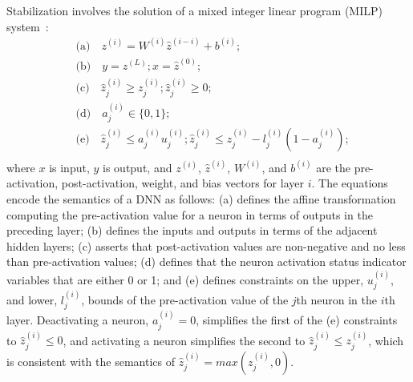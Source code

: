 \documentclass[oneside,11pt,dvipsnames]{book}
\numberwithin{equation}{section}
\theoremstyle{definition}
\theoremstyle{remark}
\newcommand{\functiontextformat}[1]{\textrm{\texttt{#1}}}
\newcommand{\tool}{\texttt{NeuralSAT}}
\begin{document}

Stabilization involves the solution of a mixed integer linear program (MILP) system~\cite{tjeng2019evaluating}:
\begin{equation}
    \begin{aligned}
        &\mbox{(a)}\quad z^{(i)} = W^{(i)} \hat{z}^{(i-i)} + b^{(i)}; \\
        &\mbox{(b)}\quad y = z^{(L)};  x = \hat{z}^{(0)}; \\
        &\mbox{(c)}\quad \hat{z}_j^{(i)} \ge {z}_j^{(i)}; \hat{z}_j^{(i)} \ge 0; \\
        &\mbox{(d)}\quad a_j^{(i)} \in \{ 0, 1\} ;\\
        &\mbox{(e)}\quad \hat{z}_j^{(i)} \le {a}_j^{(i)} {u}_j^{(i)}; \hat{z}_j^{(i)} \le {z}_j^{(i)} - {l}_j^{(i)}(1 - {a}_j^{(i)}); \\
    \end{aligned}
    \label{eq:mip}
\end{equation}
where $x$ is input, $y$ is output, and $z^{(i)}$, $\hat{z}^{(i)}$, $W^{(i)}$, and $b^{(i)}$ are the pre-activation, post-activation, weight, and bias vectors for layer $i$.
The equations encode the semantics of a DNN as follows:
(a) defines the affine transformation computing the pre-activation value for a neuron in terms of outputs in the preceding layer;
(b) defines the inputs and outputs in terms of the adjacent hidden layers;
(c) asserts that post-activation values are non-negative and no less than pre-activation values;
(d) defines that the neuron activation status indicator variables that are either 0 or 1; and
(e) defines constraints on the upper, $u_j^{(i)}$, and lower, $l_j^{(i)}$, bounds of the pre-activation value of the $j$th neuron in the $i$th layer.
Deactivating a neuron, $a_j^{(i)} = 0$, simplifies the first of the (e) constraints to $\hat{z}_j^{(i)} \le 0$, and activating a neuron simplifies the second to $\hat{z}_j^{(i)} \le z_j^{(i)}$, which is consistent with the semantics of $\hat{z}_j^{(i)} = max(z_j^{(i)},0)$.

\end{document}
